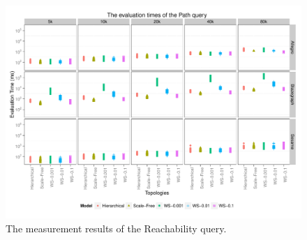 \begin{figure}[!ht]
	\centering
	\includegraphics[width=160mm, keepaspectratio]{figures/query1_all.pdf}
	\caption{The measurement results of the Reachability query.}
	\label{fig:query1}
\end{figure}

